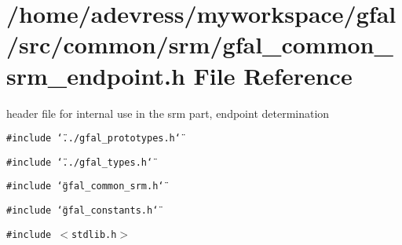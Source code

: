 \section{/home/adevress/myworkspace/gfal/src/common/srm/gfal\_\-common\_\-srm\_\-endpoint.h File Reference}
\label{gfal__common__srm__endpoint_8h}
header file for internal use in the srm part, endpoint determination 

{\tt \#include \char`\"{}../gfal\_\-prototypes.h\char`\"{}}\par
{\tt \#include \char`\"{}../gfal\_\-types.h\char`\"{}}\par
{\tt \#include \char`\"{}gfal\_\-common\_\-srm.h\char`\"{}}\par
{\tt \#include \char`\"{}gfal\_\-constants.h\char`\"{}}\par
{\tt \#include $<$stdlib.h$>$}\par
